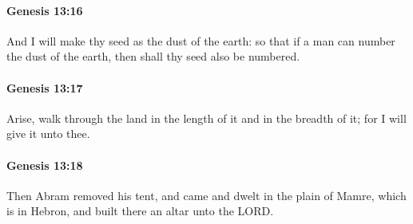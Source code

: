 		\paragraph{Genesis 13:16} %
			\label{GENESIS-13-16}

			And I will make thy seed as the dust of the earth: so that if a man can number the dust of the earth, then shall thy seed also be numbered.


		\paragraph{Genesis 13:17} %
			\label{GENESIS-13-17}

			Arise, walk through the land in the length of it and in the breadth of it; for I will give it unto thee.


		\paragraph{Genesis 13:18} %
			\label{GENESIS-13-18}

			Then Abram removed his tent, and came and dwelt in the plain of Mamre, which is in Hebron, and built there an altar unto the LORD.


